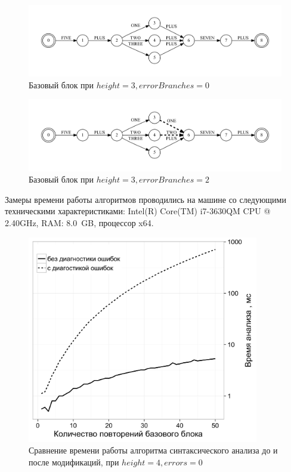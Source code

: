 \begin{figure}[h!]
 \centering
 \includegraphics[width=\textwidth]{Azimov/pictures/block_black.pdf}
 \caption{Базовый блок при $height=3, errorBranches=0$}
 \label{block}
\end{figure}

\begin{figure}[h!]
 \centering
 \includegraphics[width=\textwidth]{Azimov/pictures/errorBlock_black.pdf}
 \caption{Базовый блок при $height=3, errorBranches=2$}
 \label{errorBlock}
\end{figure}

Замеры времени работы алгоритмов проводились на машине со следующими техническими характеристиками: Intel(R) Core(TM) i7-3630QM CPU @ 2.40GHz, RAM: 8.0~GB, процессор x64.

\begin{figure}[H]
 \centering
 \includegraphics[width=0.9\textwidth]{Azimov/pictures/compare_black.png}
 \caption{Сравнение времени работы алгоритма синтаксического анализа до и после модификаций, при $height=4, errors=0$}
 \label{compare}
\end{figure}


